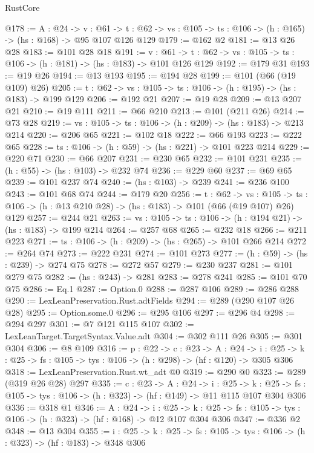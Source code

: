 \begin{lexlean}{RustCore}
\begin{coremodule}
@178 := {A : @24} ->
  {v : @61} ->
  {t : @62} -> {vs : @105} -> {ts : @106} -> (h : @165) -> (hs : @168) -> @95 @107 @126 @129
@179 := @162 @2
@181 := @13 @26 @28
@183 := @101 @28 @18
@191 := {v : @61} ->
  {t : @62} -> {vs : @105} -> {ts : @106} -> (h : @181) -> (hs : @183) -> @101 @126 @129
@192 := @179 @31
@193 := @19 @26
@194 := @13 @193
@195 := @194 @28
@199 := @101 (@66 (@19 @109) @26)
@205 := {t : @62} -> {vs : @105} -> {ts : @106} -> (h : @195) -> (hs : @183) -> @199 @129
@206 := @192 @21
@207 := @19 @28
@209 := @13 @207 @21
@210 := @19 @111
@211 := @66 @210
@213 := @101 (@211 @26)
@214 := @73 @28
@219 := {vs : @105} -> {ts : @106} -> (h : @209) -> (hs : @183) -> @213 @214
@220 := @206 @65
@221 := @102 @18
@222 := @66 @193
@223 := @222 @65
@228 := {ts : @106} -> (h : @59) -> (hs : @221) -> @101 @223 @214
@229 := @220 @71
@230 := @66 @207
@231 := @230 @65
@232 := @101 @231
@235 := (h : @55) -> (hs : @103) -> @232 @74
@236 := @229 @60
@237 := @69 @65
@239 := @101 @237 @74
@240 := (hs : @103) -> @239
@241 := @236 @100
@243 := @101 @68 @74
@244 := @179 @20
@256 := {t : @62} ->
  {vs : @105} -> {ts : @106} -> (h : @13 @210 @28) -> (hs : @183) -> @101 (@66 (@19 @107) @26) @129
@257 := @244 @21
@263 := {vs : @105} -> {ts : @106} -> (h : @194 @21) -> (hs : @183) -> @199 @214
@264 := @257 @68
@265 := @232 @18
@266 := @211 @223
@271 := {ts : @106} -> (h : @209) -> (hs : @265) -> @101 @266 @214
@272 := @264 @74
@273 := @222 @231
@274 := @101 @273
@277 := (h : @59) -> (hs : @239) -> @274 @75
@278 := @272 @57
@279 := @230 @237
@281 := @101 @279 @75
@282 := (hs : @243) -> @281
@283 := @278 @241
@285 := @101 @70 @75
@286 := Eq.{1}
@287 := Option.{0}
@288 := @287 @106
@289 := @286 @288
@290 := LexLeanPreservation.Rust.adtFields
@294 := @289 (@290 @107 @26 @28)
@295 := Option.some.{0}
@296 := @295 @106
@297 := @296 @4
@298 := @294 @297
@301 := @7 @121 @115 @107
@302 := LexLeanTarget.TargetSyntax.Value.adt
@304 := @302 @111 @26
@305 := @301 @304
@306 := @8 @109
@316 := {p : @22} ->
  {c : @23} ->
  {A : @24} ->
  {i : @25} -> {k : @25} -> {fs : @105} -> {tys : @106} -> (h : @298) -> (hf : @120) -> @305 @306
@318 := LexLeanPreservation.Rust.wt_adt @0
@319 := @290 @0
@323 := @289 (@319 @26 @28) @297
@335 := {c : @23} ->
  {A : @24} ->
  {i : @25} ->
  {k : @25} -> {fs : @105} -> {tys : @106} -> (h : @323) -> (hf : @149) -> @11 @115 @107 @304 @306
@336 := @318 @1
@346 := {A : @24} ->
  {i : @25} ->
  {k : @25} -> {fs : @105} -> {tys : @106} -> (h : @323) -> (hf : @168) -> @12 @107 @304 @306
@347 := @336 @2
@348 := @13 @304
@355 := {i : @25} ->
  {k : @25} -> {fs : @105} -> {tys : @106} -> (h : @323) -> (hf : @183) -> @348 @306

\end{coremodule}
\end{lexlean}
